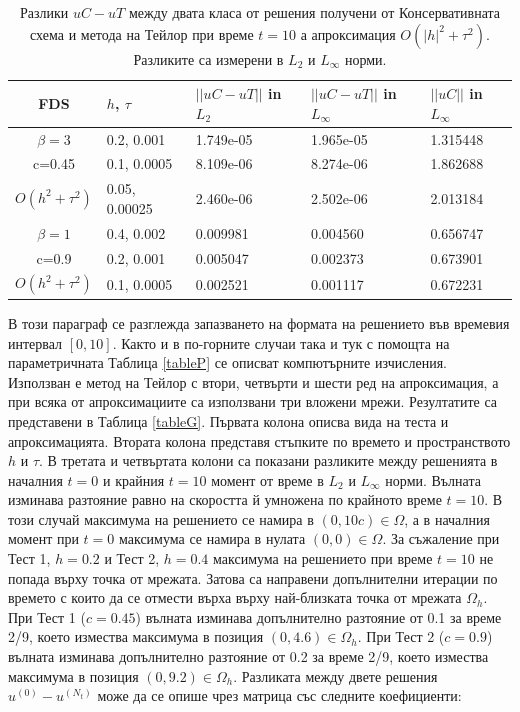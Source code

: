 \documentclass{article}
\theoremstyle{remark}
\begin{document}
\begin{table}[ht]
\centering
\small
		\begin{tabular}{||c|l|l|l|l||}
			\hline
			\hline
      FDS        &$h$, $\tau$  &   $||uC - uT||$  in $L_2$     &  $||uC - uT||$ in $L_\infty$ & $||uC||$ in $L_\infty$ \\
   			\hline 
					\hline 
  $\beta=3$                   &0.2, 0.001         &  1.749e-05      &  1.965e-05  & 1.315448     \\
   c=0.45                        &0.1, 0.0005        &  8.109e-06       & 8.274e-06 &  1.862688     \\
     $O(h^2 + \tau^ 2)$ &0.05, 0.00025     & 2.460e-06         &2.502e-06  &   2.013184   \\
			\hline 
			\hline 
       $\beta=1$          &0.4, 0.002        & 0.009981     & 0.004560 & 0.656747   \\
                  c=0.9      &0.2, 0.001        & 0.005047      & 0.002373  & 0.673901   \\
  $O(h^2+ \tau^2)$ &0.1, 0.0005         & 0.002521      &0.001117 & 0.672231   \\
			\hline
	   \hline
			\hline 
		\end{tabular}
		\caption{Разлики $uC - uT$ между двата класа от решения получени от Консервативната схема и метода на Тейлор при време $t=10$ а апроксимация $O(|h|^2 + \tau^2)$. Разликите са измерени в $L_2$ и $L_\infty$ норми.}
\label{tableF}
\end{table}
\FloatBarrier
В този параграф се разглежда запазването на формата на решението във времевия интервал $[0, 10]$. Както и в по-горните случаи така и тук с помощта на параметричната Таблица \ref{tableP} се описват компютърните изчисления. Използван е метод на Тейлор с втори, четвърти и шести ред на апроксимация, а при всяка от апроксимациите са използвани три вложени мрежи. Резултатите са представени в Таблица \ref{tableG}. Първата колона описва вида на теста и апроксимацията. Втората колона представя стъпките по времето и пространството $h$ и $\tau$. В третата и четвъртата колони са показани разликите между решенията в началния $t=0$ и крайния  $t=10$ момент от време в  $L_2$ и $L_\infty$ норми. Вълната изминава разтояние равно на скоростта й умножена по крайното време $t=10$. В този случай максимума на решението се намира в $(0, 10 c) \in \Omega$, а в началния момент при $t=0$ максимума се намира в нулата $(0, 0) \in \Omega$. За съжаление при Тест 1, $h=0.2$ и Тест 2, $h=0.4$ максимума на решението при време $t=10$ не попада върху точка от мрежата. Затова са направени допълнителни итерации по времето с които да се отмести върха върху най-близката точка от мрежата $\Omega_h$. При Тест 1 ($c=0.45$) вълната изминава допълнително разтояние от 0.1 за време 2/9, което измества максимума в позиция $(0, 4.6) \in \Omega_h$. При Тест 2 ($c=0.9$) вълната изминава допълнително разтояние от 0.2 за време 2/9, което измества максимума в позиция $(0, 9.2) \in \Omega_h$. Разликата между двете решения $u^{(0)} - u^{(N_t)}$ може да се опише чрез матрица със следните коефициенти:
\end{document}
